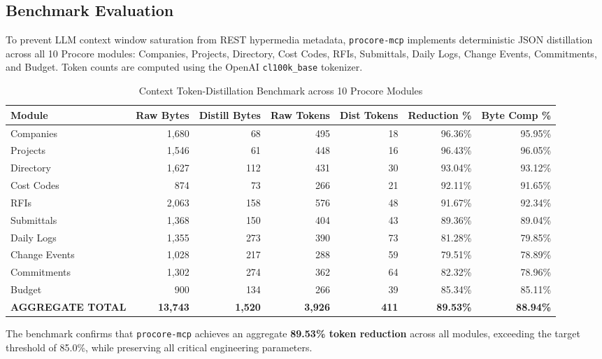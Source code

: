 \documentclass[10pt,conference,letterpaper]{article}
\begin{document}
\subsection{Benchmark Evaluation}

To prevent LLM context window saturation from REST hypermedia metadata, \texttt{procore-mcp} implements deterministic JSON distillation across all 10 Procore modules: Companies, Projects, Directory, Cost Codes, RFIs, Submittals, Daily Logs, Change Events, Commitments, and Budget. Token counts are computed using the OpenAI \texttt{cl100k\_base} tokenizer.

\begin{table}[h]
\centering
\caption{Context Token-Distillation Benchmark across 10 Procore Modules}
\label{tab:benchmark}
\begin{tabular}{lrrrrrr}
\toprule
\textbf{Module} & \textbf{Raw Bytes} & \textbf{Distill Bytes} & \textbf{Raw Tokens} & \textbf{Dist Tokens} & \textbf{Reduction \%} & \textbf{Byte Comp \%} \\
\midrule
Companies     & 1,680 &  68 & 495 & 18 & 96.36\% & 95.95\% \\
Projects      & 1,546 &  61 & 448 & 16 & 96.43\% & 96.05\% \\
Directory     & 1,627 & 112 & 431 & 30 & 93.04\% & 93.12\% \\
Cost Codes    &   874 &  73 & 266 & 21 & 92.11\% & 91.65\% \\
RFIs          & 2,063 & 158 & 576 & 48 & 91.67\% & 92.34\% \\
Submittals    & 1,368 & 150 & 404 & 43 & 89.36\% & 89.04\% \\
Daily Logs    & 1,355 & 273 & 390 & 73 & 81.28\% & 79.85\% \\
Change Events & 1,028 & 217 & 288 & 59 & 79.51\% & 78.89\% \\
Commitments   & 1,302 & 274 & 362 & 64 & 82.32\% & 78.96\% \\
Budget        &   900 & 134 & 266 & 39 & 85.34\% & 85.11\% \\
\midrule
\textbf{AGGREGATE TOTAL} & \textbf{13,743} & \textbf{1,520} & \textbf{3,926} & \textbf{411} & \textbf{89.53\%} & \textbf{88.94\%} \\
\bottomrule
\end{tabular}
\end{table}

The benchmark confirms that \texttt{procore-mcp} achieves an aggregate \textbf{89.53\% token reduction} across all modules, exceeding the target threshold of 85.0\%, while preserving all critical engineering parameters.
\end{document}
